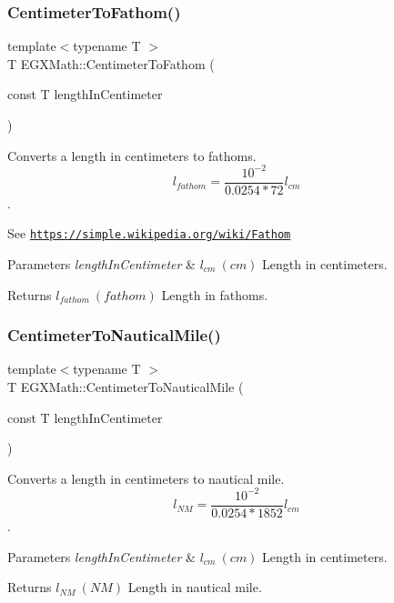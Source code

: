 \subsubsection{\texorpdfstring{Centimeter\+To\+Fathom()}{CentimeterToFathom()}}
{\footnotesize\ttfamily template$<$typename T $>$ \\
T E\+G\+X\+Math\+::\+Centimeter\+To\+Fathom (\begin{DoxyParamCaption}\item[{const T}]{length\+In\+Centimeter }\end{DoxyParamCaption})}



Converts a length in centimeters to fathoms. \[ l_{fathom}= \frac{10^{-2}}{0.0254 * 72} l_{cm} \]. 

See \href{https://simple.wikipedia.org/wiki/Fathom}{\tt https\+://simple.\+wikipedia.\+org/wiki/\+Fathom} 
\begin{DoxyParams}{Parameters}
{\em length\+In\+Centimeter} & $ l_{cm}\ (cm)$ Length in centimeters. \\
\hline
\end{DoxyParams}
\begin{DoxyReturn}{Returns}
$ l_{fathom}\ (fathom)$ Length in fathoms. 
\end{DoxyReturn}
\mbox{\label{group___e_g_x_math-_conversions-_length_conversions-_s_i-_centimeter-_nautical_ga65cf4453e28b375ee5c52389620939c6}} 
\subsubsection{\texorpdfstring{Centimeter\+To\+Nautical\+Mile()}{CentimeterToNauticalMile()}}
{\footnotesize\ttfamily template$<$typename T $>$ \\
T E\+G\+X\+Math\+::\+Centimeter\+To\+Nautical\+Mile (\begin{DoxyParamCaption}\item[{const T}]{length\+In\+Centimeter }\end{DoxyParamCaption})}



Converts a length in centimeters to nautical mile. \[ l_{NM}= \frac{10^{-2}}{0.0254 * 1852} l_{cm} \]. 


\begin{DoxyParams}{Parameters}
{\em length\+In\+Centimeter} & $ l_{cm}\ (cm)$ Length in centimeters. \\
\hline
\end{DoxyParams}
\begin{DoxyReturn}{Returns}
$ l_{NM}\ (NM)$ Length in nautical mile. 
\end{DoxyReturn}
